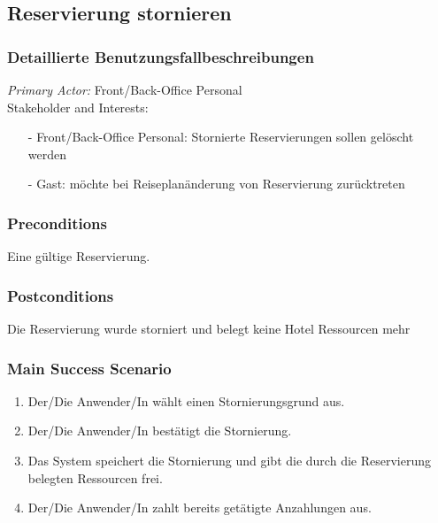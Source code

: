 \documentclass[./detailed_overview_usecases.tex]{subfiles}
\begin{document}
    \subsection{Reservierung stornieren}
    \subsubsection{Detaillierte Benutzungsfallbeschreibungen}
    \textit{Primary Actor:}
    Front/Back-Office Personal
    \\
    Stakeholder and Interests:
    \begin{itemize}
        \item[-] Front/Back-Office Personal: Stornierte Reservierungen sollen gelöscht werden
        \item[-] Gast: möchte bei Reiseplanänderung von Reservierung zurücktreten
    \end{itemize}

    \subsubsection*{Preconditions}
    Eine gültige Reservierung.

    \subsubsection*{Postconditions}
    Die Reservierung wurde storniert und belegt keine Hotel Ressourcen mehr

    \subsubsection*{Main Success Scenario}
    \begin{enumerate}
        \item Der/Die Anwender/In wählt einen Stornierungsgrund aus.
        \item Der/Die Anwender/In bestätigt die Stornierung.
        \item Das System speichert die Stornierung und gibt die durch die Reservierung belegten Ressourcen frei.
        \item Der/Die Anwender/In zahlt bereits getätigte Anzahlungen aus.
    \end{enumerate}
\end{document}
